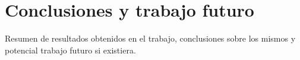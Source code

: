 \chapter{Conclusiones y trabajo futuro}

Resumen de resultados obtenidos en el trabajo, conclusiones sobre los mismos y
potencial trabajo futuro si existiera.
